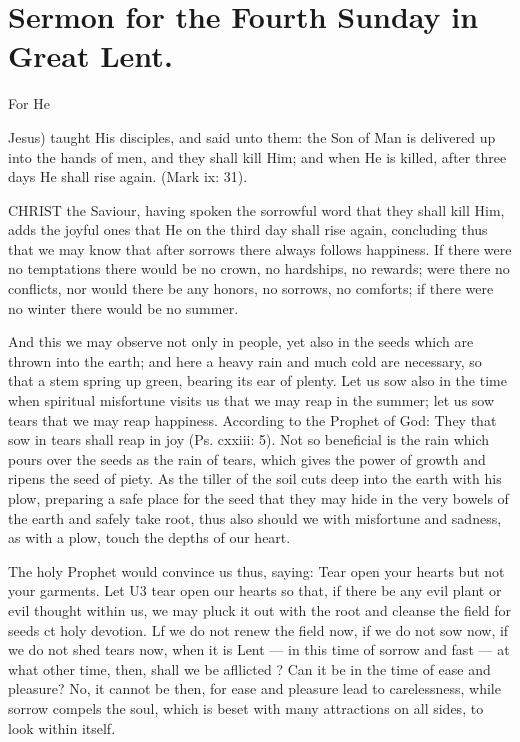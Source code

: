 \chapter{Sermon for the Fourth Sunday in Great Lent.}

For He {Jesus) taught His disciples, and said unto 
them: the Son of Man is delivered up into the hands of 
men, and they shall kill Him; and when He is killed, 
after three days He shall rise again. (Mark ix: 31). 

CHRIST the Saviour, having spoken the sorrowful
word that they shall kill Him, adds 
the joyful ones that He on the third day shall 
rise again, concluding thus that we may know 
that after sorrows there always follows happiness.
If there were no temptations there would 
be no crown, no hardships, no rewards; were 
there no conflicts, nor would there be any honors,
no sorrows, no comforts; if there were no 
winter there would be no summer. 

And this we may observe not only in people, 
yet also in the seeds which are thrown into the 
earth; and here a heavy rain and much cold are 
necessary, so that a stem spring up green, bearing
its ear of plenty. Let us sow also in the 
time when spiritual misfortune visits us that we 
may reap in the summer; let us sow tears that we may reap happiness. According to the 
Prophet of God: They that sow in tears shall 
reap in joy (Ps. cxxiii: 5). Not so beneficial 
is the rain which pours over the seeds as the 
rain of tears, which gives the power of growth 
and ripens the seed of piety. As the tiller of 
the soil cuts deep into the earth with his plow, 
preparing a safe place for the seed that they 
may hide in the very bowels of the earth and 
safely take root, thus also should we with misfortune
and sadness, as with a plow, touch the 
depths of our heart. 

The holy Prophet would convince us thus, 
saying: Tear open your hearts but not your 
garments. Let U3 tear open our hearts so that, 
if there be any evil plant or evil thought within 
us, we may pluck it out with the root and cleanse 
the field for seeds ct holy devotion. Lf we do 
not renew the field now, if we do not sow now, 
if we do not shed tears now, when it is Lent — 
in this time of sorrow and fast — at what other 
time, then, shall we be afllicted ? Can it be in 
the time of ease and pleasure? No, it cannot 
be then, for ease and pleasure lead to carelessness,
while sorrow compels the soul, which is 
beset with many attractions on all sides, to look 
within itself. 

}
